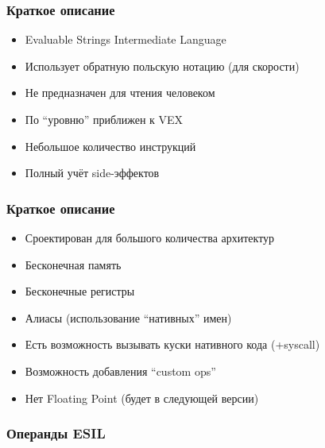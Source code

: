 \documentclass[10pt,pdf,utf8,english,compress,hyperref={unicode}]{beamer}
\begin{document}
\begin{frame}[fragile]
  \frametitle{Краткое описание}
     \begin{itemize}
        \item Evaluable Strings Intermediate Language 
		\item Использует обратную польскую нотацию (для скорости)
		\item Не предназначен для чтения человеком
		\item По ``уровню'' приближен к VEX
		\item Небольшое количество инструкций
		\item Полный учёт side-эффектов
      \end{itemize}
\end{frame}

\begin{frame}[fragile]
  \frametitle{Краткое описание}
     \begin{itemize}
        \item Сроектирован для большого количества архитектур
		\item Бесконечная память
		\item Бесконечные регистры
		\item Алиасы (использование ``нативных'' имен)
		\item Есть возможность вызывать куски нативного кода (+syscall)
		\item Возможность добавления ``custom ops''
		\item Нет Floating Point (будет в следующей версии)
      \end{itemize}
\end{frame}

\begin{frame}[fragile]
  \frametitle{Операнды ESIL}
    \begin{table}[H]
	\caption{ESIL Operands }
	\begin{center}
	\end{center}
	\end{table}
\end{frame}
\end{document}
